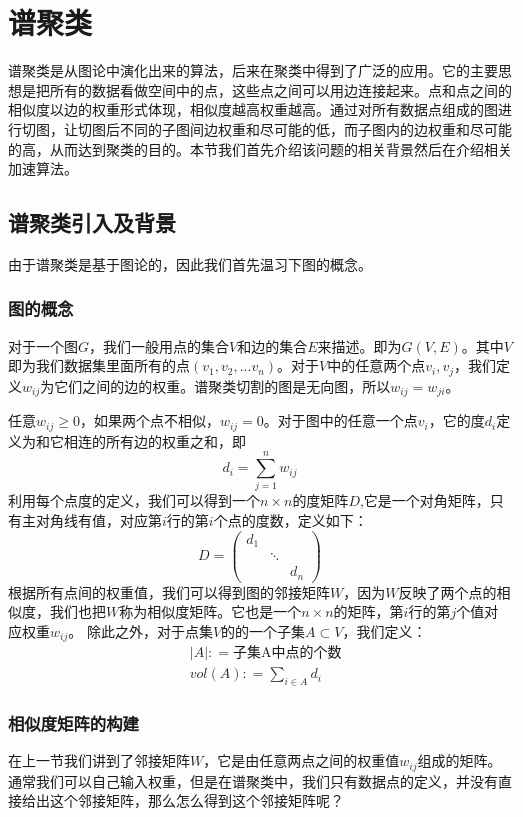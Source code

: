 \chapter{谱聚类}
谱聚类是从图论中演化出来的算法，后来在聚类中得到了广泛的应用。它的主要思想是把所有的数据看做空间中的点，这些点之间可以用边连接起来。点和点之间的相似度以边的权重形式体现，相似度越高权重越高。通过对所有数据点组成的图进行切图，让切图后不同的子图间边权重和尽可能的低，而子图内的边权重和尽可能的高，从而达到聚类的目的。本节我们首先介绍该问题的相关背景然后在介绍相关加速算法。
\section{谱聚类引入及背景}
由于谱聚类是基于图论的，因此我们首先温习下图的概念。

\subsection{图的概念}
对于一个图$G$，我们一般用点的集合$V$和边的集合$E$来描述。即为$G(V,E)$。其中$V$即为我们数据集里面所有的点$(v_1, v_2,...v_n)$。对于$V$中的任意两个点$v_i,v_j$，我们定义$w_{ij}$为它们之间的边的权重。谱聚类切割的图是无向图，所以$w_{ij}=w_{ji}$。
        
任意$w_{ij}\geq 0$，如果两个点不相似，$w_{ij} = 0$。对于图中的任意一个点$v_i$，它的度$d_i$定义为和它相连的所有边的权重之和，即
\begin{equation*}
d_i = \sum\limits_{j=1}^{n}w_{ij}
\end{equation*}
利用每个点度的定义，我们可以得到一个$n\times n$的度矩阵$D$,它是一个对角矩阵，只有主对角线有值，对应第$i$行的第$i$个点的度数，定义如下：
\begin{equation*}
    D =
  \begin{pmatrix}
    d_{1} & & \\
    & \ddots & \\
    & & d_{n}
  \end{pmatrix}
\end{equation*}
根据所有点间的权重值，我们可以得到图的邻接矩阵$W$，因为$W$反映了两个点的相似度，我们也把$W$称为相似度矩阵。它也是一个$n\times n$的矩阵，第$i$行的第$j$个值对应权重$w_{ij}$。
除此之外，对于点集$V$的的一个子集$A \subset V$，我们定义：
\begin{align*}
& |A|: = \text{子集A中点的个数} \\
& vol(A): = \sum\limits_{i \in A}d_i
\end{align*}

\subsection{相似度矩阵的构建}
在上一节我们讲到了邻接矩阵$W$，它是由任意两点之间的权重值$w_{ij}$组成的矩阵。通常我们可以自己输入权重，但是在谱聚类中，我们只有数据点的定义，并没有直接给出这个邻接矩阵，那么怎么得到这个邻接矩阵呢？

